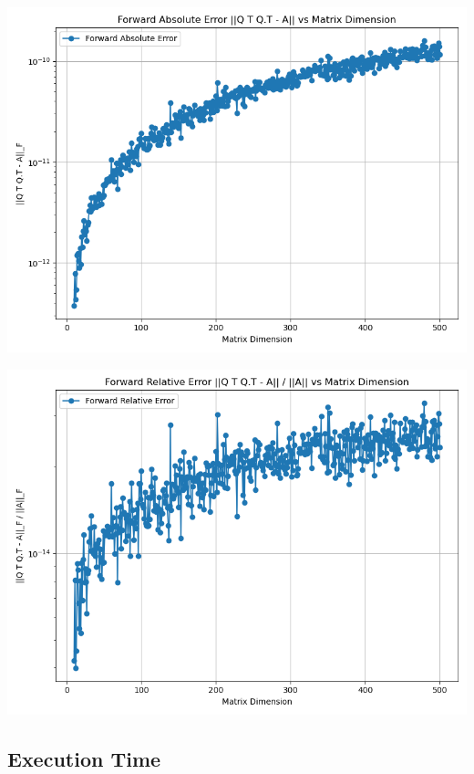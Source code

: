 \documentclass[12pt, a4paper]{ctexart}
\begin{document}
\begin{center}
    \includegraphics[scale=0.5]{forward_abs_error.png}
\end{center}

\begin{center}
    \includegraphics[scale=0.5]{forward_rel_error.png}
\end{center}

\subsection{Execution Time}
\end{document}
